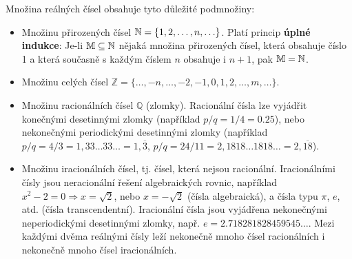       Množina reálných čísel obsahuje tyto důležité podmnožiny:
      \begin{itemize}
        \item Množinu přirozených čísel \(\mathbb{N} = \{1, 2, \ldots, n, \ldots\}\). Platí 
              princip \textbf{úplné indukce}: Je-li \(\mathbb{M} \subseteq \mathbb{N}\) nějaká 
              množina přirozených čísel, která obsahuje číslo \num{1} a která současně s každým 
              číslem \(n\) obsahuje i \(n + 1\), pak \(\mathbb{M} = \mathbb{N}\).
        \item Množinu celých čísel \(\mathbb{Z} = \{\ldots, -n, \ldots, -2, -1, 0, 1, 2, \ldots, m, 
              \ldots\}\).
        \item Množinu racionálních čísel \(\mathbb{Q}\) (zlomky). Racionální čísla lze vyjádřit 
              konečnými desetinnými zlomky (například \(p/q = 1/4 = \num{0.25}\)), nebo nekonečnými 
              periodickými desetinnými zlomky (například \(p/q = 4/3 = 1,33\ldots33\ldots = 
              1,\overline{3}\), \(p/q = 24/11 = 2,1818\ldots1818\ldots = 2,\overline{18}\)).
        \item Množinu iracionálních čísel, tj. čísel, která nejsou racionální. Iracionálními čísly 
              jsou neracionální řešení algebraických rovnic, například \(x^2 - 2 = 0 \Rightarrow x 
              = \sqrt{2}\), nebo \(x = - \sqrt{2}\) (čísla algebraická), a čísla typu \(\pi\), 
              \(e\), atd. (čísla transcendentní). Iracionální čísla jsou vyjádřena       
              nekonečnými neperiodickými desetinnými zlomky, např. 
              \(e = \num{2.718281828459545}\ldots\). Mezi každými dvěma reálnými čísly leží 
              nekonečně mnoho čísel racionálních i nekonečně mnoho čísel iracionálních.
      \end{itemize}
      
